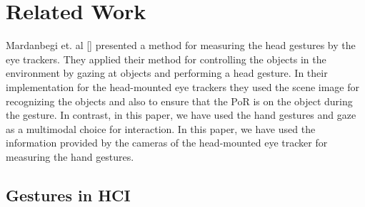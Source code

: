 \documentclass[jou,a4paper,notxfonts]{apa}
\begin{document}




\section{Related Work}

Mardanbegi et. al [] presented a method for measuring the head gestures by the eye trackers. They applied their method
for controlling the objects in the environment by gazing at objects and performing a head gesture. In their
implementation for the head-mounted eye trackers they used the scene image for recognizing the objects and also to
ensure that the PoR is on the object during the gesture. In contrast, in this paper, we have used the hand gestures and
gaze as a multimodal choice for interaction. In this paper, we have used the information provided by the cameras of the
head-mounted eye tracker for measuring the hand gestures.





%
\subsection{Gestures in HCI}
%
\end{document}
